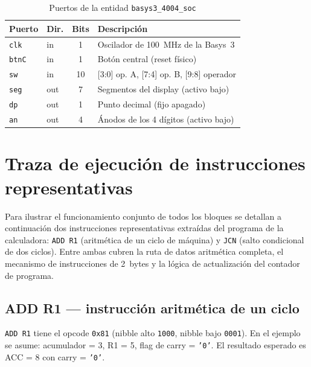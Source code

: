 \documentclass[%
    school=etsisi,%
    type=pfg,%
    degree=61CI,%
]{upm-report}
\begin{document}
\begin{table}[H]
\centering
\caption{Puertos de la entidad \texttt{basys3\_4004\_soc}}
\label{tab:soc}
\begin{tabularx}{\textwidth}{@{}llcX@{}}
\toprule
\textbf{Puerto} & \textbf{Dir.} & \textbf{Bits} & \textbf{Descripción} \\
\midrule
\texttt{clk}  & in  & 1  & Oscilador de 100~MHz de la Basys~3 \\
\texttt{btnC} & in  & 1  & Botón central (reset físico) \\
\texttt{sw}   & in  & 10 & [3:0] op. A, [7:4] op. B, [9:8] operador \\
\texttt{seg}  & out & 7  & Segmentos del display (activo bajo) \\
\texttt{dp}   & out & 1  & Punto decimal (fijo apagado) \\
\texttt{an}   & out & 4  & Ánodos de los 4 dígitos (activo bajo) \\
\bottomrule
\end{tabularx}
\end{table}

\section{Traza de ejecución de instrucciones representativas}
\label{s:traza}

Para ilustrar el funcionamiento conjunto de todos los bloques se detallan
a continuación dos instrucciones representativas extraídas del programa de
la calculadora: \texttt{ADD~R1} (aritmética de un ciclo de máquina) y
\texttt{JCN} (salto condicional de dos ciclos).  Entre ambas cubren la
ruta de datos aritmética completa, el mecanismo de instrucciones de
2~bytes y la lógica de actualización del contador de programa.

\subsection{ADD R1 --- instrucción aritmética de un ciclo}

\texttt{ADD~R1} tiene el opcode \texttt{0x81} (nibble alto \texttt{1000},
nibble bajo \texttt{0001}).  En el ejemplo se asume: acumulador = 3,
R1 = 5, flag de carry = \texttt{'0'}.  El resultado esperado es ACC
= 8 con carry = \texttt{'0'}.
\end{document}
